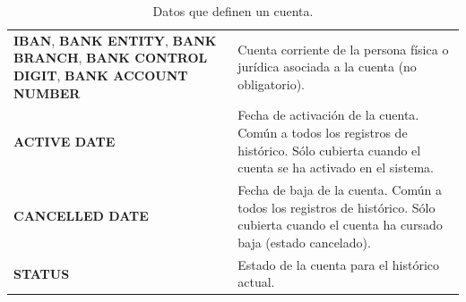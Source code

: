 \begin{table}
{\begin{tabular}{|m{5cm} m{9cm}|}
	\textbf{IBAN}, \textbf{BANK ENTITY}, \textbf{BANK BRANCH}, \textbf{BANK CONTROL DIGIT}, \textbf{BANK ACCOUNT NUMBER} & Cuenta corriente de la persona física o jurídica asociada a la cuenta (no obligatorio).\\
	\textbf{ACTIVE DATE} & Fecha de activación de la cuenta. Común a todos los registros de histórico. Sólo cubierta cuando el cuenta se ha activado en el sistema.\\	
	\textbf{CANCELLED DATE} & Fecha de baja de la cuenta. Común a todos los registros de histórico. Sólo cubierta cuando el cuenta ha cursado baja (estado cancelado).	\\
	\textbf{STATUS} & Estado de la cuenta para el histórico actual.	
	\\\hline
  \end{tabular}
  } %
  \caption{Datos que definen un cuenta.}
  \label{tab:cuenta}
\end{table}

